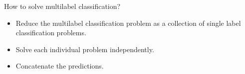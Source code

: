 \documentclass[first=purple,second=dgreen,logo=redexc]{aaltoslides}
\begin{document}
{\begin{frame}{How to solve multilabel classification?}
	\begin{itemize}
		\item Reduce the multilabel classification problem as a collection of single label classification problems.
		\item Solve each individual problem independently. 
		\item Concatenate the predictions.
	\end{itemize}
	\begin{center}
\end{center}
\end{frame}}
\end{document}
